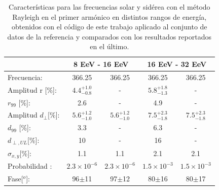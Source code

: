 \documentclass[11pt,papel,oneside,singlespace]{ibtesis}
\begin{document}
\begin{table}[H]
    \begin{small}
        \begin{center}
            \begin{tabular}[c]{l|c|c||c|c|}
                                            & \multicolumn{2}{|c||}{8 EeV - 16 EeV}              & \multicolumn{2}{|c|}{16 EeV - 32 EeV}                   \\ \hline
                Frecuencia:                 & 366.25                    & 366.25 \cite{Aab_2020} & 366.25                   & 366.25 \cite{Aab_2020}   \\ \hline
                Amplitud r [\%]:            & $4.4^{+1.0}_{-0.8}$ 	    & -                      & $5.8^{+1.8}_{-1.3}$ 	    & -                         \\
                $r_{99}$ [\%]:              & 2.6                       & -                      & 4.9                      & -                          \\\hline
                Amplitud $d_\perp$[\%]:     & $5.6^{+1.2}_{-1.0}$ 	    & $5.6^{+1.2}_{-1.0}$    & $7.5^{+2.3}_{-1.8}$ 	    & $7.5^{+2.3}_{-1.8}$                   \\
                $d_{99}$ [\%]:              & 3.3                       & -                      & 6.3                      & -                         \\
                $d_{\perp,UL}$[\%]:         & 10                        & -                      & 16                       & -                                 \\\hline
                $\sigma_{x,y}$[\%]:         & 1.1	                    & 1.1                    & 2.1	                    & 2.1                           \\
                Probabilidad      :         & $2.3\times10^{-6}$	    & $2.3\times10^{-6}$     & $1.5\times10^{-3}$	    & $1.5\times10^{-3}$              \\
                Fase[$^o$]:                 & 96$\pm$11                 & 97$\pm$12              & 80$\pm$16                & 80$\pm$17                     \\
            \end{tabular}
        \end{center}
    \end{small}
    \caption{Características para las frecuencias solar y sidérea con el método Rayleigh en el primer armónico en distintos rangos de energía, obtenidos con el código de este trabajo aplicado al conjunto de datos de la referencia \cite{Aab_2020} y comparados con los resultados reportados en el último.}
\end{table}


\begin{biblio}
	
\end{biblio}
    
    
\end{document}
